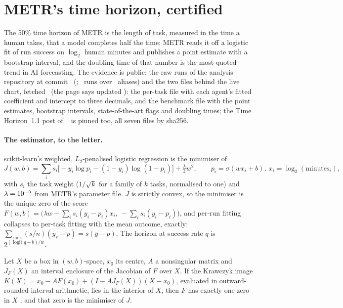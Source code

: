\documentclass[11pt]{article}
\theoremstyle{definition}
\begin{document}
\section{METR's time horizon, certified}\label{sec:horizon}

The 50\% time horizon of METR \cite{Kwa25} is the length of task, measured in the time a human takes, that a model completes half the time; METR reads it off a logistic fit of run success on $\log_2$ human minutes and publishes a point estimate with a bootstrap interval, and the doubling time of that number is the most-quoted trend in AI forecasting. The evidence is public: the raw runs of the analysis repository \cite{METRrepo} at commit \HzRepoCommit\ (\HzRepoDate; \HzRuns\ runs over \HzRunsAgents\ aliases) and the two files behind the live chart, fetched \HzFetched\ (the page says updated \HzSiteUpdated): the per-task file with each agent's fitted coefficient and intercept to three decimals, and the benchmark file with the point estimates, bootstrap intervals, state-of-the-art flags and doubling times; the Time Horizon~1.1 post of \HzPostDate\ \cite{METR26} is pinned too, all seven files by sha256.

\paragraph{The estimator, to the letter.} scikit-learn's weighted, $L_2$-penalised logistic regression is the minimiser of
\[
J(w,b)=\sum_i s_i\bigl[-y_i\log p_i-(1-y_i)\log(1-p_i)\bigr]+\tfrac{\lambda}{2}w^2,\qquad p_i=\sigma(wx_i+b),\ x_i=\log_2(\text{minutes}_i),
\]
with $s_i$ the task weight ($1/\sqrt k$ for a family of $k$ tasks, normalised to one) and $\lambda=10^{-5}$ from METR's parameter file. $J$ is strictly convex, so the minimiser is the unique zero of the score $F(w,b)=\bigl(\lambda w-\sum_i s_i(y_i-p_i)x_i,\ -\sum_i s_i(y_i-p_i)\bigr)$, and per-run fitting collapses to per-task fitting with the mean outcome, exactly: $\sum_{\text{runs}}(s/n)(y_r-p)=s(\bar y-p)$. The horizon at success rate $q$ is $2^{(\operatorname{logit}q-b)/w}$.

\begin{proposition}\label{prop:kraw}
Let $X$ be a box in $(w,b)$-space, $x_0$ its centre, $A$ a nonsingular matrix and $J_F(X)$ an interval enclosure of the Jacobian of $F$ over $X$. If the Krawczyk image $K(X)=x_0-AF(x_0)+(I-AJ_F(X))(X-x_0)$, evaluated in outward-rounded interval arithmetic, lies in the interior of $X$, then $F$ has exactly one zero in $X$ \cite{Krawczyk69,Rump10}, and that zero is the minimiser of $J$.
\end{proposition}
\end{document}
